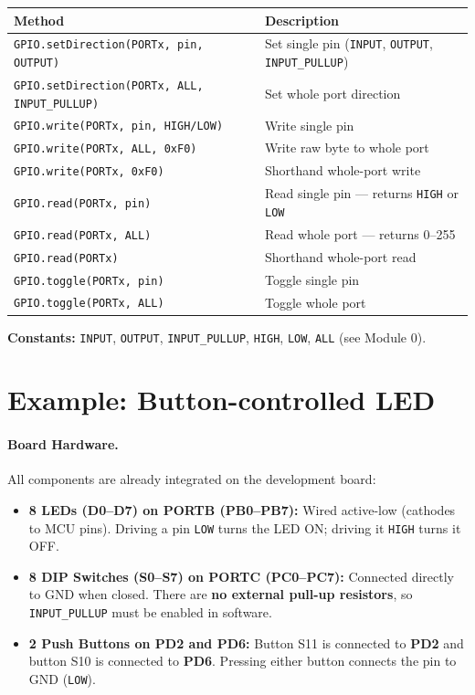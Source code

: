 \documentclass[11pt,a4paper]{article}
\begin{document}
\begin{center}
\small
\begin{tabular}{ll}
\toprule
\textbf{Method} & \textbf{Description} \\
\midrule
\texttt{GPIO.setDirection(PORTx, pin, OUTPUT)} & Set single pin (\texttt{INPUT}, \texttt{OUTPUT}, \texttt{INPUT\_PULLUP}) \\
\texttt{GPIO.setDirection(PORTx, ALL, INPUT\_PULLUP)} & Set whole port direction \\
\texttt{GPIO.write(PORTx, pin, HIGH/LOW)} & Write single pin \\
\texttt{GPIO.write(PORTx, ALL, 0xF0)} & Write raw byte to whole port \\
\texttt{GPIO.write(PORTx, 0xF0)} & Shorthand whole-port write \\
\texttt{GPIO.read(PORTx, pin)} & Read single pin --- returns \texttt{HIGH} or \texttt{LOW} \\
\texttt{GPIO.read(PORTx, ALL)} & Read whole port --- returns 0--255 \\
\texttt{GPIO.read(PORTx)} & Shorthand whole-port read \\
\texttt{GPIO.toggle(PORTx, pin)} & Toggle single pin \\
\texttt{GPIO.toggle(PORTx, ALL)} & Toggle whole port \\
\bottomrule
\end{tabular}
\end{center}

\textbf{Constants:} \texttt{INPUT}, \texttt{OUTPUT}, \texttt{INPUT\_PULLUP},
\texttt{HIGH}, \texttt{LOW}, \texttt{ALL} (see Module 0).

\newpage
\section{Example: Button-controlled LED}

\paragraph{Board Hardware.} All components are already integrated on the development board:
\begin{itemize}
  \item \textbf{8 LEDs (D0--D7) on PORTB (PB0--PB7):} Wired active-low (cathodes to MCU pins). Driving a pin \texttt{LOW} turns the LED ON; driving it \texttt{HIGH} turns it OFF.
  \item \textbf{8 DIP Switches (S0--S7) on PORTC (PC0--PC7):} Connected directly to GND when closed. There are \textbf{no external pull-up resistors}, so \texttt{INPUT\_PULLUP} must be enabled in software.
  \item \textbf{2 Push Buttons on PD2 and PD6:} Button S11 is connected to \textbf{PD2} and button S10 is connected to \textbf{PD6}. Pressing either button connects the pin to GND (\texttt{LOW}).
\end{itemize}
\end{document}
